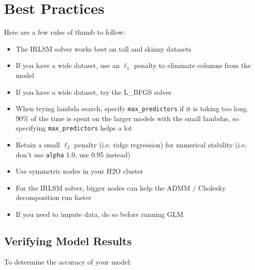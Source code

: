 \section{Best Practices}

Here are a few rules of thumb to follow:

\begin{itemize}
\item The IRLSM solver works best on tall and skinny datasets
\item If you have a wide dataset, use an  $\ell_1$ penalty to eliminate columns from the model
\item If you have a wide dataset, try the L\_BFGS solver
\item When trying lambda search, specify \texttt{max\_predictors} if it is taking too long. 90\% of the time is spent on the larger models with the small lambdas, so specifying \texttt{max\_predictors} helps a lot
\item Retain a small  $\ell_2$ penalty (i.e. ridge regression) for numerical stability (i.e. don’t use \texttt{alpha} 1.0, use 0.95 instead)
\item Use symmetric nodes in your H2O cluster
\item For the IRLSM solver, bigger nodes can help the ADMM / Cholesky decomposition run faster
\item If you need to impute data, do so before running GLM
\end{itemize}

\subsection{Verifying Model Results}

To determine the accuracy of your model: 

